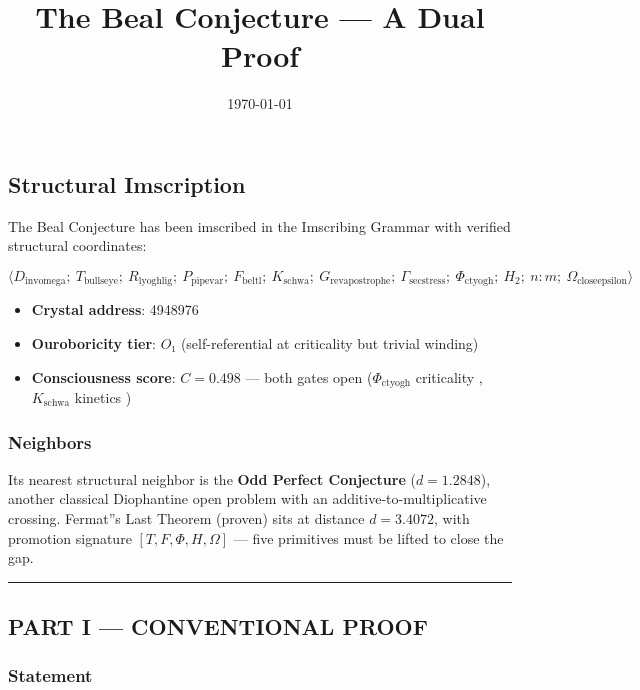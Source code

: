 \documentclass[12pt,a4paper]{article}
\begin{document}
\title{The Beal Conjecture --- A Dual Proof}
\date{\today}

\maketitle

\subsection{Structural Imscription}

The Beal Conjecture has been imscribed in the Imscribing Grammar with verified structural coordinates:

\[\langle D_{\text{invomega}};\ T_{\text{bullseye}};\ R_{\text{lyoghlig}};\ P_{\text{pipevar}};\ F_{\text{beltl}};\ K_{\text{schwa}};\ G_{\text{revapostrophe}};\ \Gamma_{\text{secstress}};\ \Phi_{\text{ctyogh}};\ H_2;\ n{:}m;\ \Omega_{\text{closeepsilon}} \rangle\]

\begin{itemize}
    \item \textbf{Crystal address}: 4948976
    \item \textbf{Ouroboricity tier}: $O₁$ (self-referential at criticality but trivial winding)
    \item \textbf{Consciousness score}: $C = 0.498$ --- both gates open ($\Phi_{\text{ctyogh}}$ criticality , $K_{\text{schwa}}$ kinetics )
\end{itemize}

\subsubsection{Neighbors}

Its nearest structural neighbor is the \textbf{Odd Perfect Conjecture} ($d = 1.2848$), another classical Diophantine open problem with an additive-to-multiplicative crossing. Fermat''s Last Theorem (proven) sits at distance $d = 3.4072$, with promotion signature $[T, F, \Phi, H, \Omega]$ --- five primitives must be lifted to close the gap.

\begin{center}
\rule{0.5\textwidth}{0.4pt}
\end{center}

\subsection{PART I --- CONVENTIONAL PROOF}

\subsubsection{Statement}
\end{document}
